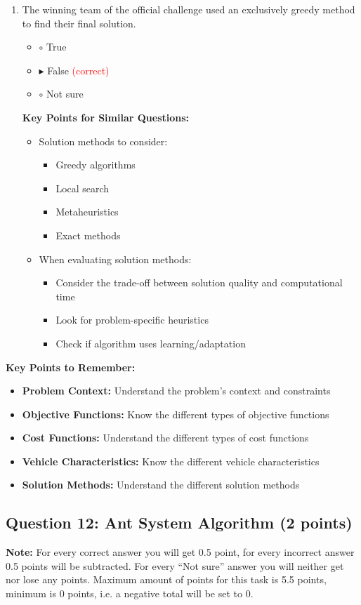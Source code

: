 \begin{enumerate}[label=\alph*)]
\item The winning team of the official challenge used an exclusively greedy method to find their final solution.
\begin{itemize}
\item $\circ$ True
\item $\blacktriangleright$ False \hspace{1em} \textcolor{red}{(correct)}
\item $\circ$ Not sure
\end{itemize}

\textbf{Key Points for Similar Questions:}
\begin{itemize}
\item Solution methods to consider:
  \begin{itemize}
  \item Greedy algorithms
  \item Local search
  \item Metaheuristics
  \item Exact methods
  \end{itemize}
\item When evaluating solution methods:
  \begin{itemize}
  \item Consider the trade-off between solution quality and computational time
  \item Look for problem-specific heuristics
  \item Check if algorithm uses learning/adaptation
  \end{itemize}
\end{itemize}
\end{enumerate}

\textbf{Key Points to Remember:}
\begin{itemize}
\item \textbf{Problem Context:} Understand the problem's context and constraints
\item \textbf{Objective Functions:} Know the different types of objective functions
\item \textbf{Cost Functions:} Understand the different types of cost functions
\item \textbf{Vehicle Characteristics:} Know the different vehicle characteristics
\item \textbf{Solution Methods:} Understand the different solution methods
\end{itemize}

\subsection{Question 12: Ant System Algorithm (2 points)}
\textbf{Note:} For every correct answer you will get 0.5 point, for every incorrect answer 0.5 points will be subtracted. For every ``Not sure'' answer you will neither get nor lose any points. Maximum amount of points for this task is 5.5 points, minimum is 0 points, i.e. a negative total will be set to 0.

